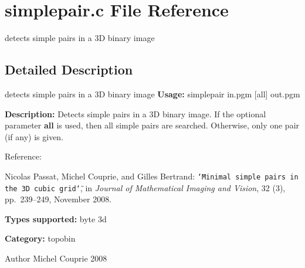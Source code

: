 \section{simplepair.c File Reference}
\label{simplepair_8c}


detects simple pairs in a 3D binary image  




\subsection{Detailed Description}
detects simple pairs in a 3D binary image {\bfseries Usage:} simplepair in.pgm [all] out.pgm

{\bfseries Description:} Detects simple pairs in a 3D binary image. If the optional parameter {\bfseries all} is used, then all simple pairs are searched. Otherwise, only one pair (if any) is given.

Reference:\par
 [PCB08] Nicolas Passat, Michel Couprie, and Gilles Bertrand: {\tt \char`\"{}Minimal simple pairs in the 3D cubic grid\char`\"{}}, in {\itshape Journal of Mathematical Imaging and Vision\/}, 32 (3), pp.~239–249, November 2008.\par


{\bfseries Types supported:} byte 3d

{\bfseries Category:} topobin

\begin{DoxyAuthor}{Author}
Michel Couprie 2008 
\end{DoxyAuthor}
